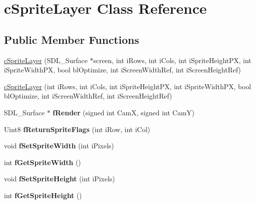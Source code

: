 \hypertarget{classc_sprite_layer}{\section{c\-Sprite\-Layer Class Reference}
\label{classc_sprite_layer}
}
\subsection*{Public Member Functions}
\begin{DoxyCompactItemize}
\item 
\hyperlink{classc_sprite_layer_a0d17c2ce0ee9e6843f905ece2cd4ea98}{c\-Sprite\-Layer} (S\-D\-L\-\_\-\-Surface $\ast$screen, int i\-Rows, int i\-Cols, int i\-Sprite\-Height\-P\-X, int i\-Sprite\-Width\-P\-X, bool bl\-Optimize, int i\-Screen\-Width\-Ref, int i\-Screen\-Height\-Ref)
\item 
\hyperlink{classc_sprite_layer_a1311a2140a4ee1694256443f362365ca}{c\-Sprite\-Layer} (int i\-Rows, int i\-Cols, int i\-Sprite\-Height\-P\-X, int i\-Sprite\-Width\-P\-X, bool bl\-Optimize, int i\-Screen\-Width\-Ref, int i\-Screen\-Height\-Ref)
\item 
\hypertarget{classc_sprite_layer_ab6962819241e36e554c0559726fca708}{S\-D\-L\-\_\-\-Surface $\ast$ {\bfseries f\-Render} (signed int Cam\-X, signed int Cam\-Y)}\label{classc_sprite_layer_ab6962819241e36e554c0559726fca708}

\item 
\hypertarget{classc_sprite_layer_a84650f8fab3823252ab60d464dfb6599}{Uint8 {\bfseries f\-Return\-Sprite\-Flags} (int i\-Row, int i\-Col)}\label{classc_sprite_layer_a84650f8fab3823252ab60d464dfb6599}

\item 
\hypertarget{classc_sprite_layer_a6ec5ded5090bebcfacdbb7ced1a39811}{void {\bfseries f\-Set\-Sprite\-Width} (int i\-Pixels)}\label{classc_sprite_layer_a6ec5ded5090bebcfacdbb7ced1a39811}

\item 
\hypertarget{classc_sprite_layer_ae0a59d8841d6d9b6e70e9617df2e3385}{int {\bfseries f\-Get\-Sprite\-Width} ()}\label{classc_sprite_layer_ae0a59d8841d6d9b6e70e9617df2e3385}

\item 
\hypertarget{classc_sprite_layer_acf20667a25f361e4407120d30a367aa6}{void {\bfseries f\-Set\-Sprite\-Height} (int i\-Pixels)}\label{classc_sprite_layer_acf20667a25f361e4407120d30a367aa6}

\item 
\hypertarget{classc_sprite_layer_ae52da0b10607de597a21b134afbded60}{int {\bfseries f\-Get\-Sprite\-Height} ()}\label{classc_sprite_layer_ae52da0b10607de597a21b134afbded60}


\end{DoxyCompactItemize}
